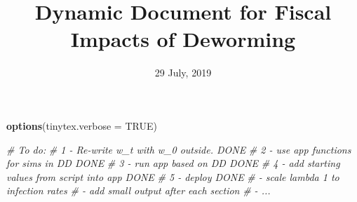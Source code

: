 \documentclass[]{article}
\title{Dynamic Document for Fiscal Impacts of Deworming}
\author{}
\date{29 July, 2019}
\newenvironment{Shaded}{\begin{snugshade}}{\end{snugshade}}
\newcommand{\CommentTok}[1]{\textcolor[rgb]{0.56,0.35,0.01}{\textit{#1}}}
\newcommand{\DataTypeTok}[1]{\textcolor[rgb]{0.13,0.29,0.53}{#1}}
\newcommand{\KeywordTok}[1]{\textcolor[rgb]{0.13,0.29,0.53}{\textbf{#1}}}
\newcommand{\NormalTok}[1]{#1}
\newcommand{\OtherTok}[1]{\textcolor[rgb]{0.56,0.35,0.01}{#1}}
\begin{document}
\maketitle

\def\blue{\color{blue}}

\begin{Shaded}
\begin{Highlighting}[]
\KeywordTok{options}\NormalTok{(}\DataTypeTok{tinytex.verbose =} \OtherTok{TRUE}\NormalTok{)}
\end{Highlighting}
\end{Shaded}

\begin{Shaded}
\begin{Highlighting}[]
\CommentTok{# To do:}
\CommentTok{# 1 - Re-write w_t with w_0 outside.                DONE}
\CommentTok{# 2 - use app functions for sims in DD              DONE }
\CommentTok{# 3 - run app based on DD                           DONE}
\CommentTok{# 4 - add starting values from script into app      DONE}
\CommentTok{# 5 - deploy                                        DONE}
\CommentTok{# - scale lambda 1 to infection rates}
\CommentTok{# - add small output after each section}
\CommentTok{# - ...}


\end{Highlighting}
\end{Shaded}
\end{document}
